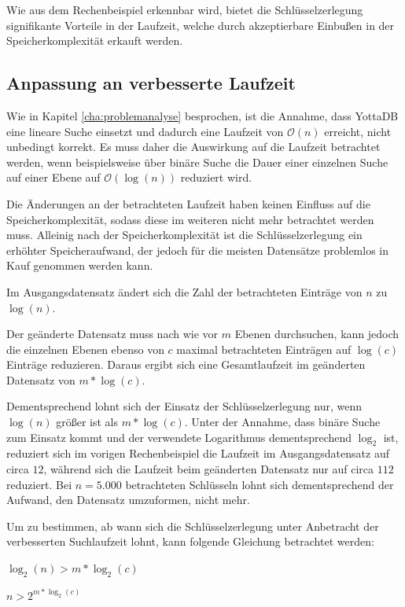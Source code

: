 \documentclass[oneside]{ausarbeitung}
\begin{document}
Wie aus dem Rechenbeispiel erkennbar wird, bietet die Schlüsselzerlegung signifikante Vorteile in der Laufzeit, welche durch akzeptierbare Einbußen in der Speicherkomplexität erkauft werden. 
	

\pagebreak

\subsection{Anpassung an verbesserte Laufzeit}

Wie in Kapitel \ref{cha:problemanalyse} besprochen, ist die Annahme, dass YottaDB eine lineare Suche einsetzt und dadurch eine Laufzeit von $\mathcal{O}(n)$ erreicht, nicht unbedingt korrekt. Es muss daher die Auswirkung auf die Laufzeit betrachtet werden, wenn beispielsweise über binäre Suche die Dauer einer einzelnen Suche auf einer Ebene auf $\mathcal{O}(\log(n))$ reduziert wird. 

Die Änderungen an der betrachteten Laufzeit haben keinen Einfluss auf die Speicherkomplexität, sodass diese im weiteren nicht mehr betrachtet werden muss. Alleinig nach der Speicherkomplexität ist die Schlüsselzerlegung ein erhöhter Speicheraufwand, der jedoch für die meisten Datensätze problemlos in Kauf genommen werden kann.

Im Ausgangsdatensatz ändert sich die Zahl der betrachteten Einträge von $n$ zu $\log(n)$.

Der geänderte Datensatz muss nach wie vor $m$ Ebenen durchsuchen, kann jedoch die einzelnen Ebenen ebenso von $c$ maximal betrachteten Einträgen auf $\log(c)$ Einträge reduzieren. Daraus ergibt sich eine Gesamtlaufzeit im geänderten Datensatz von $m*\log(c)$.

Dementsprechend lohnt sich der Einsatz der Schlüsselzerlegung nur, wenn $\log(n)$ größer ist als $m*\log(c)$. Unter der Annahme, dass binäre Suche zum Einsatz kommt und der verwendete Logarithmus dementsprechend $\log_2$ ist, reduziert sich im vorigen Rechenbeispiel die Laufzeit im Ausgangsdatensatz auf circa $12$, während sich die Laufzeit beim geänderten Datensatz nur auf circa $112$ reduziert. Bei $n=5.000$ betrachteten Schlüsseln lohnt sich dementsprechend der Aufwand, den Datensatz umzuformen, nicht mehr.

Um zu bestimmen, ab wann sich die Schlüsselzerlegung unter Anbetracht der verbesserten Suchlaufzeit lohnt, kann folgende Gleichung betrachtet werden:

\begin{center}
	$\log_2(n) > m*\log_2(c)$
	
	$n > 2^{m*\log_2(c)}$
\end{center}
\end{document}
